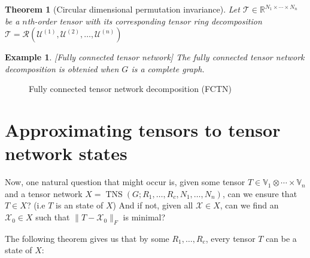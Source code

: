 \documentclass[11pt,a4paper,openright,oneside]{book}
\numberwithin{equation}{section}
\newtheorem{thm0}[defn0]{Theorem}
\newtheorem{example0}[defn0]{Example}
\newenvironment{theorem}{\bigskip \begin{thm0}}{\end{thm0}}
\newenvironment{example}{ \begin{example0}\rm}{\end{example0}}
\DeclareMathOperator{\TNS}{TNS}
\begin{document}
\begin{theorem} [Circular dimensional permutation invariance] Let $\mathcal{T} \in \mathbb{R}^{N_1 \times \cdots \times N_n}$ be
    a $n$th-order tensor with its corresponding tensor ring decomposition $\mathcal{T} = \mathcal{R}(\mathcal{U}^{(1)}, \mathcal{U}^{(2)}, \dots, \mathcal{U}^{(n)})$

\end{theorem}

\begin{example}[Fully connected tensor network]
The fully connected tensor network decomposition is obtenied when $G$ is a complete graph.
\end{example}

\begin{figure}[h]
    \begin{tikzpicture}

    \end{tikzpicture}
    \caption{Fully connected tensor network decomposition (FCTN)}
    \label{fctn:schema}
\end{figure}


































\section{Approximating tensors to tensor network states}

Now, one natural question that might occur is, given some tensor $T \in \mathbb{V}_1 \otimes \cdots \times \mathbb{V}_n$ and a 
tensor network $X = \TNS(G; R_1, \dots, R_c, N_1, \dots, N_n)$, can we ensure that $T \in X$? (i.e $T$ is an state of $X$) And if not, given all $\mathcal{X} \in X$,
can we find an $\mathcal{X}_0 \in X$ such that $\| T - \mathcal{X}_0 \|_F$ is minimal?

The following theorem gives us that by some $R_1, \dots, R_c$, every tensor $T$ can be a state of $X$:
\end{document}
